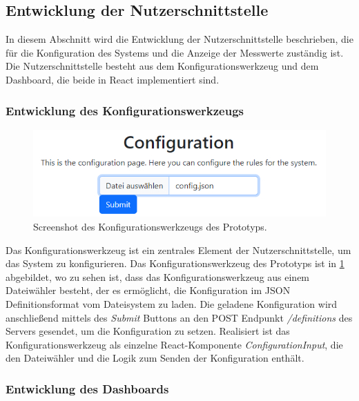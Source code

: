 \subsection{Entwicklung der Nutzerschnittstelle}
In diesem Abschnitt wird die Entwicklung der Nutzerschnittstelle beschrieben, die für die Konfiguration des Systems und die Anzeige der Messwerte zuständig ist.
Die Nutzerschnittstelle besteht aus dem Konfigurationswerkzeug und dem Dashboard, die beide in React implementiert sind.

\subsubsection{Entwicklung des Konfigurationswerkzeugs}

\begin{figure}[!htbp]
	\centering
	\includegraphics[width=\textwidth]{images/Konfiguration.png}
	\caption[Konfigurationswerkzeug des Prototyps]{
		Screenshot des Konfigurationswerkzeugs des Prototyps.
	}
	\label{pic:konfiguration}
\end{figure}

Das Konfigurationswerkzeug ist ein zentrales Element der Nutzerschnittstelle, um das System zu konfigurieren.
Das Konfigurationswerkzeug des Prototyps ist in \cref{pic:konfiguration} abgebildet, wo zu sehen ist, dass das Konfigurationswerkzeug aus einem Dateiwähler besteht, der es ermöglicht, die Konfiguration im JSON Definitionsformat vom Dateisystem zu laden.
Die geladene Konfiguration wird anschließend mittels des \emph{Submit} Buttons an den POST Endpunkt \emph{/definitions} des Servers gesendet, um die Konfiguration zu setzen.
Realisiert ist das Konfigurationswerkzeug als einzelne React-Komponente \emph{ConfigurationInput}, die den Dateiwähler und die Logik zum Senden der Konfiguration enthält.

\subsubsection{Entwicklung des Dashboards}

